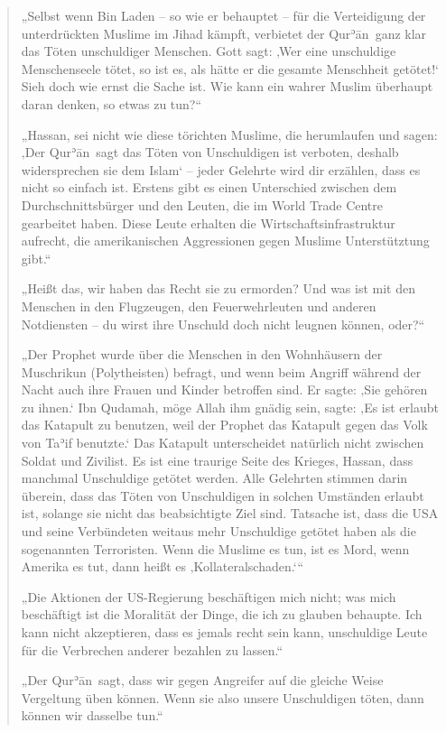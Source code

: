 \documentclass[12pt]{memoir}
\def\´{ʾ} %
\def \Quran{Qur\-\´ān} %
\def\–{\hskip0pt-\hskip0pt}
\begin{document}
\begin{quote}
„Selbst wenn Bin Laden – so wie er behauptet –
für die Verteidigung der unterdrückten Muslime im Jihad kämpft,
verbietet der \Quran\ ganz klar das Töten unschuldiger Menschen.
Gott sagt: ‚Wer eine unschuldige Menschenseele tötet, so ist es,
als hätte er die gesamte Menschheit getötet!‘
Sieh doch wie ernst die Sache ist.
Wie kann ein wahrer Muslim überhaupt daran denken, so etwas zu tun?“

„Hassan, sei nicht wie diese törichten Muslime, die herumlaufen und sagen:
‚Der \Quran\ sagt das Töten von Unschuldigen ist verboten,
deshalb widersprechen sie dem Islam‘ –
jeder Gelehrte wird dir erzählen, dass es nicht so einfach ist.
Erstens gibt es einen Unterschied zwischen dem Durchschnittsbürger
und den Leuten, die im World Trade Centre gearbeitet haben.
Diese Leute erhalten die Wirtschaftsinfrastruktur aufrecht,
die amerikanischen Aggressionen gegen Muslime Unterstütztung gibt.“

„Heißt das, wir haben das Recht sie zu ermorden?
Und was ist mit den Menschen in den Flugzeugen,
den Feuerwehrleuten und anderen Notdiensten –
du wirst ihre Unschuld doch nicht leugnen können, oder?“

„Der Prophet wurde über die Menschen in den Wohnhäusern der Muschrikun
(Polytheisten) befragt, und wenn beim Angriff während der Nacht
auch ihre Frauen und Kinder betroffen sind.
Er sagte: ‚Sie gehören zu ihnen.‘
Ibn Qudamah, möge Allah ihm gnädig sein, sagte:
‚Es ist erlaubt das Katapult zu benutzen, weil der Prophet
das Katapult gegen das Volk von Ta\´if benutzte.‘
Das Katapult unterscheidet natürlich nicht zwischen Soldat und Zivilist.
Es ist eine traurige Seite des Krieges, Hassan,
dass manchmal Unschuldige getötet werden.
Alle Gelehrten stimmen darin überein,
dass das Töten von Unschuldigen
in solchen Umständen erlaubt ist,
solange sie nicht das beabsichtigte Ziel sind.
Tatsache ist, dass die USA und seine Verbündeten
weitaus mehr Unschuldige getötet haben als die sogenannten Terroristen.
Wenn die Muslime es tun, ist es Mord,
wenn Amerika es tut, dann heißt es ‚Kollateralschaden.‘“

„Die Aktionen der US\–Regierung beschäftigen mich nicht;
was mich beschäftigt ist die Moralität der Dinge, die ich zu glauben behaupte.
Ich kann nicht akzeptieren, dass es jemals recht sein kann,
unschuldige Leute für die Verbrechen anderer bezahlen zu lassen.“

„Der \Quran\ sagt, dass wir gegen Angreifer
auf die gleiche Weise Vergeltung üben können.
Wenn sie also unsere Unschuldigen töten, dann können wir dasselbe tun.“


\end{quote}
\end{document}
